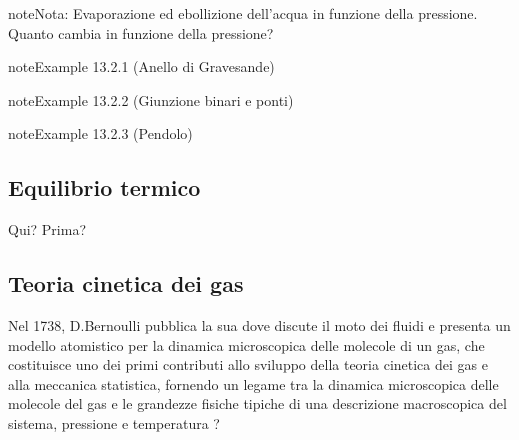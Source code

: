 \documentclass[letterpaper,10pt,italian]{jupyterBook}
\begin{document}
\begin{sphinxadmonition}{note}{Nota:}
\sphinxAtStartPar
Evaporazione ed ebollizione dell’acqua in funzione della pressione. Quanto cambia in funzione della pressione?
\end{sphinxadmonition}


\label{ch/thermodynamics/foundation-experiments:thermodynamics:history:th-expansion:gravesande}
\begin{sphinxadmonition}{note}{Example 13.2.1 (Anello di Gravesande)}


\end{sphinxadmonition}
\label{ch/thermodynamics/foundation-experiments:thermodynamics:history:th-expansion:junctions}
\begin{sphinxadmonition}{note}{Example 13.2.2 (Giunzione binari e ponti)}


\end{sphinxadmonition}
\label{ch/thermodynamics/foundation-experiments:thermodynamics:history:th-expansion:pendulum}
\begin{sphinxadmonition}{note}{Example 13.2.3 (Pendolo)}


\end{sphinxadmonition}




\subsection{Equilibrio termico}
\label{\detokenize{ch/thermodynamics/foundation-experiments:equilibrio-termico}}\label{\detokenize{ch/thermodynamics/foundation-experiments:physics-hs-thermodynamics-foundation-experiments-th-equilibrium}}
\sphinxAtStartPar
  Qui? Prima? 


\subsection{Teoria cinetica dei gas}
\label{\detokenize{ch/thermodynamics/foundation-experiments:teoria-cinetica-dei-gas}}\label{\detokenize{ch/thermodynamics/foundation-experiments:physics-hs-thermodynamics-foundation-experiments-kinetic-theory}}
\sphinxAtStartPar
Nel 1738, D.Bernoulli pubblica la sua  dove discute il moto dei fluidi e presenta un modello atomistico per la dinamica microscopica delle molecole di un gas, che costituisce uno dei primi contributi allo sviluppo della teoria cinetica dei gas e alla meccanica statistica, fornendo un legame tra la dinamica microscopica delle molecole del gas e le grandezze fisiche tipiche di una descrizione macroscopica del sistema, pressione e  temperatura  ? 
\end{document}
